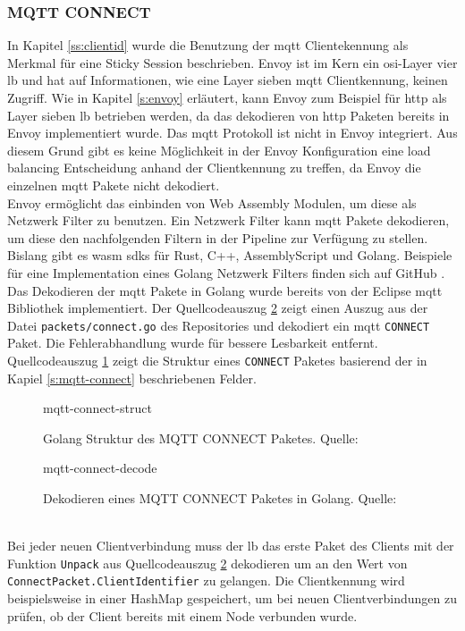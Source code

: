 \subsubsection{MQTT CONNECT}
In Kapitel \ref{ss:clientid} wurde die Benutzung der \ac{mqtt} Clientekennung als Merkmal für eine Sticky Session beschrieben. Envoy ist im Kern ein \ac{osi}-Layer vier \acl{lb} und hat auf Informationen, wie eine Layer sieben \ac{mqtt} Clientkennung, keinen Zugriff. Wie in Kapitel \ref{s:envoy} erläutert, kann Envoy zum Beispiel für \ac{http} als Layer sieben \ac{lb} betrieben werden, da das dekodieren von \ac{http} Paketen bereits in Envoy implementiert wurde.
Das \ac{mqtt} Protokoll ist nicht in Envoy integriert. Aus diesem Grund gibt es keine Möglichkeit in der Envoy Konfiguration eine load balancing Entscheidung anhand der Clientkennung zu treffen, da Envoy die einzelnen \ac{mqtt} Pakete nicht dekodiert.
\\
Envoy ermöglicht das einbinden von Web Assembly Modulen, um diese als Netzwerk Filter zu benutzen. Ein Netzwerk Filter kann \ac{mqtt} Pakete dekodieren, um diese den nachfolgenden Filtern in der Pipeline zur Verfügung zu stellen. Bislang gibt es \ac{wasm} \acp{sdk} für Rust, C++, AssemblyScript und Golang. \cite{sebastianHowWriteWASM} Beispiele für eine Implementation eines Golang Netzwerk Filters finden sich auf GitHub \cite{TetratelabsProxywasmgosdk2021}.
\\
Das Dekodieren der \ac{mqtt} Pakete in Golang wurde bereits von der Eclipse \ac{mqtt} Bibliothek \cite{EclipsePahoMqtt2021} implementiert.
Der Quellcodeauszug \ref{code:mqtt-connect-decode} zeigt einen Auszug aus der Datei \verb|packets/connect.go| des Repositories und dekodiert ein \ac{mqtt} \verb|CONNECT| Paket. Die Fehlerabhandlung wurde für bessere Lesbarkeit entfernt. Quellcodeauszug \ref{code:mqtt-connect-struct} zeigt die Struktur eines \verb|CONNECT| Paketes basierend der in Kapiel \ref{s:mqtt-connect} beschriebenen Felder.
\begin{figure}
    {mqtt-connect-struct}
    \caption{Golang Struktur des MQTT CONNECT Paketes. Quelle: \cite{EclipsePahoMqtt2021}}
    \label{code:mqtt-connect-struct}
\end{figure}
\begin{figure}
    {mqtt-connect-decode}
    \caption{Dekodieren eines MQTT CONNECT Paketes in Golang. Quelle: \cite{EclipsePahoMqtt2021}}
    \label{code:mqtt-connect-decode}
\end{figure}
\\
Bei jeder neuen Clientverbindung muss der \acl{lb} das erste Paket des Clients mit der Funktion \verb|Unpack| aus Quellcodeauszug \ref{code:mqtt-connect-decode} dekodieren um an den Wert von\newline
\verb|ConnectPacket.ClientIdentifier| zu gelangen.
Die Clientkennung wird beispielsweise in einer HashMap gespeichert, um bei neuen Clientverbindungen zu prüfen, ob der Client bereits mit einem Node verbunden wurde.

